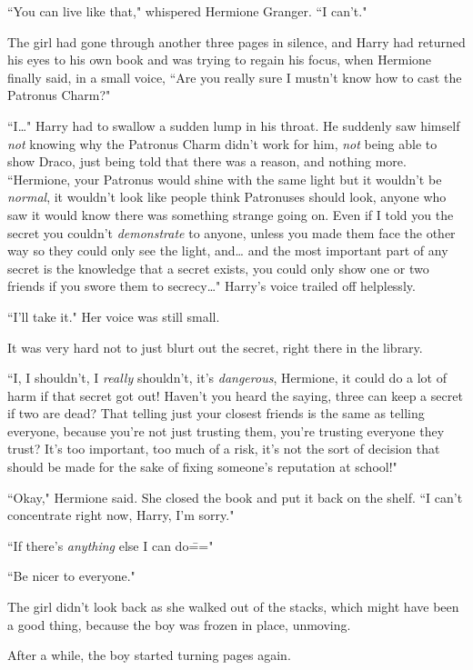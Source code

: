``You can live like that," whispered Hermione Granger. ``I can't."

The girl had gone through another three pages in silence, and Harry had returned his eyes to his own book and was trying to regain his focus, when Hermione finally said, in a small voice, ``Are you really sure I mustn't know how to cast the Patronus Charm?"

``I{\ldots}" Harry had to swallow a sudden lump in his throat. He suddenly saw himself \emph{not} knowing why the Patronus Charm didn't work for him, \emph{not} being able to show Draco, just being told that there was a reason, and nothing more. ``Hermione, your Patronus would shine with the same light but it wouldn't be \emph{normal}, it wouldn't look like people think Patronuses should look, anyone who saw it would know there was something strange going on. Even if I told you the secret you couldn't \emph{demonstrate} to anyone, unless you made them face the other way so they could only see the light, and{\ldots} and the most important part of any secret is the knowledge that a secret exists, you could only show one or two friends if you swore them to secrecy{\ldots}" Harry's voice trailed off helplessly.

``I'll take it." Her voice was still small.

It was very hard not to just blurt out the secret, right there in the library.

``I, I shouldn't, I \emph{really} shouldn't, it's \emph{dangerous}, Hermione, it could do a lot of harm if that secret got out! Haven't you heard the saying, three can keep a secret if two are dead? That telling just your closest friends is the same as telling everyone, because you're not just trusting them, you're trusting everyone they trust? It's too important, too much of a risk, it's not the sort of decision that should be made for the sake of fixing someone's reputation at school!"

``Okay," Hermione said. She closed the book and put it back on the shelf. ``I can't concentrate right now, Harry, I'm sorry."

``If there's \emph{anything} else I can do\==="

``Be nicer to everyone."

The girl didn't look back as she walked out of the stacks, which might have been a good thing, because the boy was frozen in place, unmoving.

After a while, the boy started turning pages again.

